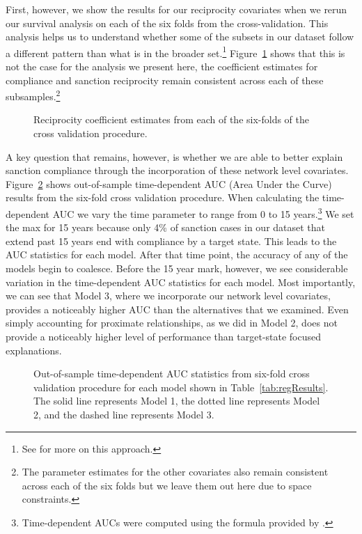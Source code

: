 First, however, we show the results for our reciprocity covariates when we rerun our survival analysis on each of the six folds from the cross-validation. This analysis helps us to understand whether some of the subsets in our dataset follow a different pattern than what is in the broader set.\footnote{See \cite{beck2008time} for more on this approach.} Figure~\ref{fig:crossval} shows that this is not the case for the analysis we present here, the coefficient estimates for compliance and sanction reciprocity remain consistent across each of these subsamples.\footnote{The parameter estimates for the other covariates also remain consistent across each of the six folds but we leave them out here due to space constraints.}


\begin{figure}[ht]
	\centering
	\caption{Reciprocity coefficient estimates from each of the six-folds of the cross validation procedure.}
	\resizebox{1\textwidth}{!}{}
	\label{fig:crossval}
\end{figure}


A key question that remains, however, is whether we are able to better explain sanction compliance through the incorporation of these network level covariates. Figure~\ref{fig:auc} shows out-of-sample time-dependent AUC (Area Under the Curve) results from the six-fold cross validation procedure. When calculating the time-dependent AUC we vary the time parameter to range from 0 to 15 years.\footnote{Time-dependent AUCs were computed using the formula provided by \citet{chambless2006estimation}.} We set the max for 15 years because only 4\% of sanction cases in our dataset that extend past 15 years end with compliance by a target state. This leads to the AUC statistics for each model. After that time point, the accuracy of any of the models begin to coalesce. Before the 15 year mark, however, we see considerable variation in the time-dependent AUC statistics for each model. Most importantly, we can see that Model 3, where we incorporate our network level covariates, provides a noticeably higher AUC than the alternatives that we examined. Even simply accounting for proximate relationships, as we did in Model 2, does not provide a noticeably higher level of performance than target-state focused explanations.

\begin{figure}[ht]
	\centering
	\caption{Out-of-sample time-dependent AUC statistics from six-fold cross validation procedure for each model shown in Table~\ref{tab:regResults}. The solid line represents Model 1, the dotted line represents Model 2, and the dashed line represents Model 3.}
	\resizebox{1\textwidth}{!}{}
	\label{fig:auc}
\end{figure}